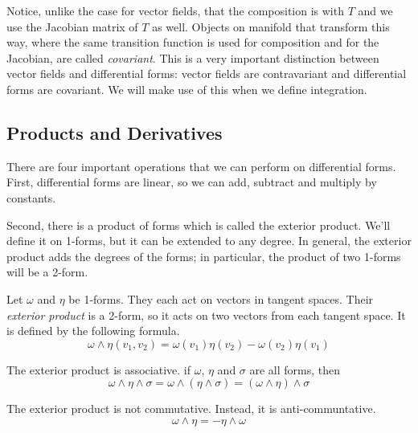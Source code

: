 \documentclass[fleqn,letterpaper]{report}
\begin{document}
Notice, unlike the case for vector fields, that the
composition is with $T$ and we use the Jacobian matrix of
$T$ as well. Objects on manifold that transform this way,
where the same transition function is used for composition and
for the Jacobian, are called \emph{covariant}. This is a very
important distinction between vector fields and differential
forms: vector fields are contravariant and differential forms
are covariant. We will make use of this when we define
integration. 

\subsection{Products and Derivatives}
\label{products-derivatives}

There are four important operations that we can perform on
differential forms. First, differential forms are linear, so
we can add, subtract and multiply by constants. 

Second, there is a product of forms which is called the
exterior product. We'll define it on 1-forms, but it can
be extended to any degree. In general, the exterior product
adds the degrees of the forms; in particular, the product of
two 1-forms will be a 2-form.

\begin{defn}
Let $\omega$ and $\eta$ be 1-forms. They each act on
vectors in tangent spaces. Their \emph{exterior product} is a
2-form, so it acts on two vectors from each tangent space. It
is defined by the following formula.
\begin{equation*}
\omega \wedge \eta (v_1,v_2) = \omega(v_1) \eta(v_2) -
\omega(v_2) \eta(v_1)
\end{equation*}
\end{defn}

\begin{prop}
The exterior product is associative. if $\omega$, $\eta$ and $\sigma$
are all forms, then
\begin{equation*}
\omega \wedge \eta \wedge \sigma = \omega \wedge (\eta \wedge
\sigma) = (\omega \wedge \eta) \wedge \sigma
\end{equation*}
\end{prop}

\begin{prop}
The exterior product is not commutative. Instead, it is
anti-communtative.
\begin{equation*}
\omega \wedge \eta = - \eta \wedge \omega
\end{equation*}
\end{prop}
\end{document}
